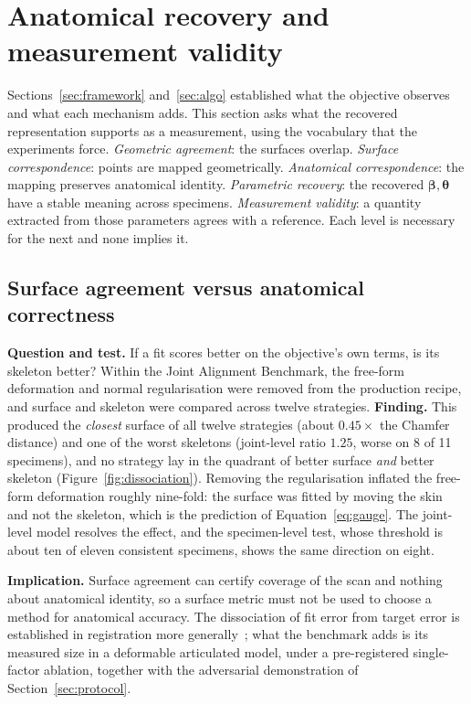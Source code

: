 \section{Anatomical recovery and measurement validity}
\label{sec:validity}

Sections~\ref{sec:framework} and~\ref{sec:algo} established what the objective
observes and what each mechanism adds. This section asks what the recovered
representation supports as a measurement, using the vocabulary that the experiments
force. \emph{Geometric agreement}: the surfaces overlap. \emph{Surface
correspondence}: points are mapped geometrically. \emph{Anatomical correspondence}:
the mapping preserves anatomical identity. \emph{Parametric recovery}: the recovered
$\bm\beta,\bm\theta$ have a stable meaning across specimens. \emph{Measurement
validity}: a quantity extracted from those parameters agrees with a reference. Each
level is necessary for the next and none implies it.

\subsection{Surface agreement versus anatomical correctness}
\label{sec:geometric-agreement}

\textbf{Question and test.} If a fit scores better on the objective's own terms, is
its skeleton better? Within the Joint Alignment Benchmark, the free-form deformation
and normal regularisation were removed from the production recipe, and surface and
skeleton were compared across twelve strategies. \textbf{Finding.} This produced the
\emph{closest} surface of all twelve strategies (about $0.45\times$ the Chamfer
distance) and one of the worst skeletons (joint-level ratio $1.25$, worse on 8 of 11
specimens), and no strategy lay in the quadrant of better surface \emph{and} better
skeleton (Figure~\ref{fig:dissociation}). Removing the regularisation inflated the
free-form deformation roughly nine-fold: the surface was fitted by moving the skin
and not the skeleton, which is the prediction of Equation~\eqref{eq:gauge}. The
joint-level model resolves the effect, and the specimen-level test, whose threshold
is about ten of eleven consistent specimens, shows the same direction on eight.

\textbf{Implication.} Surface agreement can certify coverage of the scan and nothing
about anatomical identity, so a surface metric must not be used to choose a method
for anatomical accuracy. The dissociation of fit error from target error is
established in registration more generally~\cite{fitzpatrick}; what the benchmark
adds is its measured size in a deformable articulated model, under a pre-registered
single-factor ablation, together with the adversarial demonstration of
Section~\ref{sec:protocol}.

